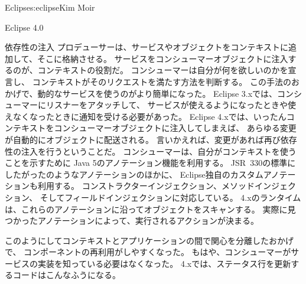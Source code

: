 \begin{aosachapter}{Eclipse}{s:eclipse}{Kim Moir}
\begin{aosasect1}{Eclipse 4.0}
\begin{aosasect2}{依存性の注入}
プロデューサーは、サービスやオブジェクトをコンテキストに追加して、そこに格納させる。
サービスをコンシューマーオブジェクトに注入するのが、コンテキストの役割だ。
コンシューマーは自分が何を欲しいのかを宣言し、
コンテキストがそのリクエストを満たす方法を判断する。
この手法のおかげで、動的なサービスを使うのがより簡単になった。
Eclipse 3.xでは、コンシューマーにリスナーをアタッチして、
サービスが使えるようになったときや使えなくなったときに通知を受ける必要があった。
Eclipse 4.xでは、いったんコンテキストをコンシューマーオブジェクトに注入してしまえば、
あらゆる変更が自動的にオブジェクトに配送される。
言いかえれば、変更があれば再び依存性の注入を行うということだ。
コンシューマーは、自分がコンテキストを使うことを示すために
Java 5のアノテーション機能を利用する。
JSR~330の標準にしたがったのようなアノテーションのほかに、
Eclipse独自のカスタムアノテーションも利用する。
コンストラクターインジェクション、メソッドインジェクション、
そしてフィールドインジェクションに対応している。
4.xのランタイムは、これらのアノテーションに沿ってオブジェクトをスキャンする。
実際に見つかったアノテーションによって、実行されるアクションが決まる。

このようにしてコンテキストとアプリケーションの間で関心を分離したおかげで、
コンポーネントの再利用がしやすくなった。
もはや、コンシューマーがサービスの実装を知っている必要はなくなった。
4.xでは、ステータス行を更新するコードはこんなふうになる。


\end{aosasect2}
\end{aosasect1}
\end{aosachapter}
